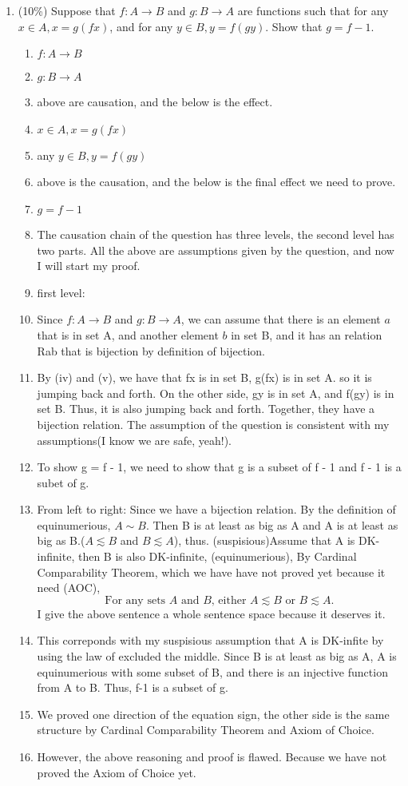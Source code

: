 \documentclass[10pt]{article}
\begin{document}
\begin{enumerate}
\begin{enumerate}
  \item (10\%) Suppose that $f: A \rightarrow B$ and $g: B \rightarrow A$ are functions such that for any $x \in A, x=g(f x)$, and for any $y \in B, y=f(g y)$. Show that $g=f-1$.
  \begin{enumerate}
    \item $f: A \rightarrow B$
    \item $g: B \rightarrow A$
    \item above are causation, and the below is the effect.
    \item $x \in A, x=g(f x)$
    \item any $y \in B, y=f(g y)$
    \item above is the causation, and the below is the final effect we need to prove.
    \item $g=f-1$
    \item The causation chain of the question has three levels, the second level has two parts. All the above are assumptions given by the question, and now I will start my proof. 
    \item first level:
    \item Since $f: A \rightarrow B$ and $g: B \rightarrow A$, we can assume that there is an element $a$ that is in set A, and another element $b$ in set B, and it has an relation Rab that is bijection by definition of bijection.
    \item By (iv) and (v), we have that fx is in set B, g(fx) is in set A. so it is jumping back and forth. On the other side, gy is in set A, and f(gy) is in set B. Thus, it is also jumping back and forth. Together, they have a bijection relation. The assumption of the question is consistent with my assumptions(I know we are safe, yeah!).
    \item To show g = f - 1, we need to show that g is a subset of f - 1 and f - 1 is a subet of g. 
    \item From left to right: Since we have a bijection relation. By the definition of equinumerious, $A \sim B$. Then B is at least as big as A and A is at least as big as B.($A \lesssim B$ and $B \lesssim A$), thus. (suspisious)Assume that A is DK-infinite, then B is also DK-infinite, (equinumerious), By Cardinal Comparability Theorem, which we have have not proved yet because it need (AOC), $$
    \text { For any sets } A \text { and } B \text {, either } A \lesssim B \text { or } B \lesssim A \text {. }
    $$
    I give the above sentence a whole sentence space because it deserves it. 
    \item This correponds with my suspisious assumption that A is DK-infite by using the law of excluded the middle. 
    Since B is at least as big as A, A is equinumerious with some subset of B, and there is an injective function from A to B. Thus, f-1 is a subset of g. 
    \item We proved one direction of the equation sign, the other side is the same structure by Cardinal Comparability Theorem and Axiom of Choice. 
    \item However, the above reasoning and proof is flawed. Because we have not proved the Axiom of Choice yet. 
    


\end{enumerate}
\end{enumerate}
\end{enumerate}
\end{document}
